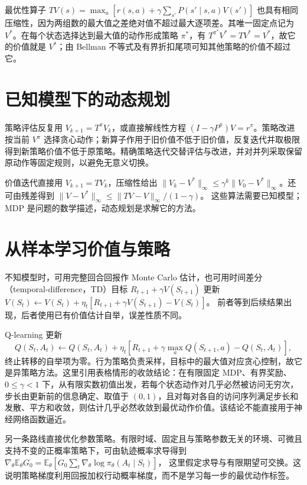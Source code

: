 最优性算子 $TV(s)=\max_a[r(s,a)+\gamma\sum_{s'}P(s'\mid s,a)V(s')]$ 也具有相同压缩性，因为两组数的最大值之差绝对值不超过最大逐项差。其唯一固定点记为 $V^*$。在每个状态选择达到最大值的动作形成策略 $\pi^*$，有 $T^{\pi^*}V^*=TV^*=V^*$，故它的价值就是 $V^*$；由 Bellman 不等式及有界折扣尾项可知其他策略的价值不超过它。

\section{已知模型下的动态规划}

策略评估反复用 $V_{k+1}=T^\pi V_k$，或直接解线性方程 $(I-\gamma P^\pi)V=r^\pi$。策略改进按当前 $V^\pi$ 选择贪心动作；新算子作用于旧价值不低于旧价值，反复迭代并取极限得到新策略价值不低于原策略。精确策略迭代交替评估与改进，并对并列采取保留原动作等固定规则，以避免无意义切换。

价值迭代直接用 $V_{k+1}=TV_k$，压缩性给出 $\|V_k-V^*\|_\infty\leq\gamma^k\|V_0-V^*\|_\infty$。还可由残差得到
$\|V-V^*\|_\infty\leq\|TV-V\|_\infty/(1-\gamma)$。
这些算法需要已知模型；MDP 是问题的数学描述，动态规划是求解它的方法。

\section{从样本学习价值与策略}

不知模型时，可用完整回合回报作 Monte Carlo 估计，也可用时间差分（temporal-difference，TD）目标 $R_{t+1}+\gamma V(S_{t+1})$ 更新
$V(S_t)\leftarrow V(S_t)+\eta_t[R_{t+1}+\gamma V(S_{t+1})-V(S_t)]$。
前者等到后续结果出现，后者使用已有价值估计自举，误差性质不同。

Q-learning 更新
\begin{equation}
 Q(S_t,A_t)\leftarrow Q(S_t,A_t)+\eta_t\left[
 R_{t+1}+\gamma\max_aQ(S_{t+1},a)-Q(S_t,A_t)\right],
 \label{eq:ml-qlearning-update}
\end{equation}
终止转移的自举项为零。行为策略负责采样，目标中的最大值对应贪心控制，故它是异策略方法。这里引用表格情形的收敛结论\cite{ml-qlearning}：在有限固定 MDP、有界奖励、$0\leq\gamma<1$ 下，从有限实数初值出发，若每个状态动作对几乎必然被访问无穷次，步长由更新前的信息确定、取值于 $(0,1)$，且对每对各自的访问序列满足步长和发散、平方和收敛，则估计几乎必然收敛到最优动作价值。该结论不能直接用于神经网络函数逼近。

另一条路线直接优化参数策略。有限时域、固定且与策略参数无关的环境、可微且支持不变的正概率策略下，可由轨迹概率求导得到
$\nabla_\theta\mathbb E_\theta G_0=\mathbb E_\theta[G_0\sum_t\nabla_\theta\log\pi_\theta(A_t\mid S_t)]$，
这里假定求导与有限期望可交换。这说明策略梯度利用回报加权行动概率梯度，而不是学习每一步的最优动作标签。


